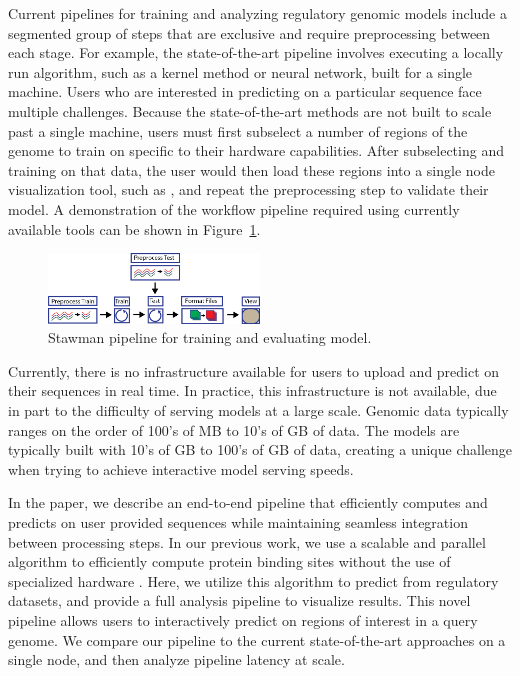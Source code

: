 \documentclass{sig-alternate-05-2015}
\begin{document}
Current pipelines for training and analyzing regulatory genomic models include a segmented group of steps that are exclusive and require preprocessing between each stage. For example, the state-of-the-art pipeline involves executing a locally run algorithm, such as a kernel method or neural network, built for a single machine. Users who are interested in predicting on a particular sequence face multiple challenges. Because the state-of-the-art methods are not built to scale past a single machine, users must first subselect a number of regions of the genome to train on specific to their hardware capabilities. After subselecting and training on that data, the user would then load these regions into a single node visualization tool, such as \cite{igv2011}, and repeat the preprocessing step to validate their model. A demonstration of the workflow pipeline required using currently available tools can be shown in Figure~\ref{fig:strawmanPipeline}.

\begin{figure}[b]
  \label{fig:strawmanPipeline}
  \includegraphics[width=0.5\textwidth]{figures/strawman.png}
  \caption{Stawman pipeline for training and evaluating model.}
\end{figure}

Currently, there is no infrastructure available for users to upload and predict on their sequences in real time. In practice, this infrastructure is not available, due in part to the difficulty of serving models at a large scale. Genomic data typically ranges on the order of 100's of MB to 10's of GB of data. The models are typically built with 10's of GB to 100's of GB of data, creating a unique challenge when trying to achieve interactive model serving speeds.

In the paper, we describe an end-to-end pipeline that efficiently computes and predicts on user provided sequences while maintaining seamless integration between processing steps. In our previous work, we use a scalable and parallel algorithm to efficiently compute protein binding sites without the use of specialized hardware \cite{tfbinding}. Here, we utilize this algorithm to predict from regulatory datasets, and provide a full analysis pipeline to visualize results. This novel pipeline allows users to interactively predict on regions of interest in a query genome. We compare our pipeline to the current state-of-the-art approaches on a single node, and then analyze pipeline latency at scale. \\
\end{document}
